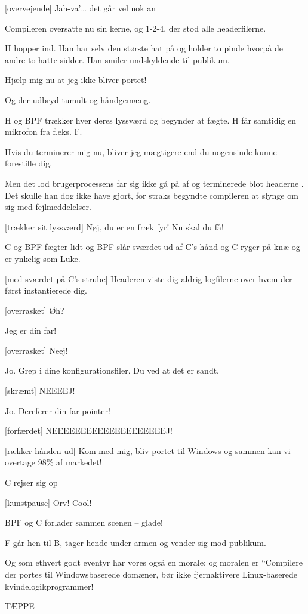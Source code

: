 \documentclass[danish]{article}
\begin{document}
\begin{sketch}
[overvejende] Jah-va'\ldots{} det går vel nok an

 Compileren oversatte nu sin kerne, og 1-2-4, der stod alle
headerfilerne.

\scene H hopper ind. Han har selv den største hat på og holder to pinde hvorpå
de andre to hatte sidder. Han smiler undskyldende til publikum.

 Hjælp mig nu at jeg ikke bliver portet!

 Og der udbryd tumult og håndgemæng.

\scene H og BPF trækker hver deres lyssværd og begynder at fægte. H får samtidig
en mikrofon fra f.eks. F.

 Hvis du terminerer mig nu, bliver jeg mægtigere end du nogensinde kunne
forestille dig.

 Men det lod brugerprocessens far sig ikke gå på af og terminerede blot
headerne . Det skulle han dog ikke have gjort, for straks
begyndte compileren at slynge om sig med fejlmeddelelser.

[trækker sit lyssværd] Nøj, du er en fræk fyr! Nu skal du få!

\scene C og BPF fægter lidt og BPF slår sværdet ud af C's hånd og C ryger på knæ
og er ynkelig som Luke.

[med sværdet på C's strube] Headeren viste dig aldrig logfilerne over
hvem der først instantierede dig.

[overrasket] Øh?

 Jeg er din far!

[overrasket] Neej!

 Jo. Grep i dine konfigurationsfiler. Du ved at det er sandt.

[skræmt] NEEEEJ!

 Jo. Dereferer din far-pointer!

[forfærdet] NEEEEEEEEEEEEEEEEEEEEJ!

[rækker hånden ud] Kom med mig, bliv portet til Windows og sammen kan vi overtage 98\%
af markedet!

\scene C rejser sig op

[kunstpause] Orv! Cool!

\scene BPF og C forlader sammen scenen -- glade!

\scene F går hen til B, tager hende under armen og vender sig mod publikum.

 Og som ethvert godt eventyr har vores også en morale; og moralen er
``Compilere der portes til Windowsbaserede domæner, bør ikke fjernaktivere
Linux-baserede kvindelogikprogrammer!

\scene TÆPPE

\end{sketch}
\end{document}
